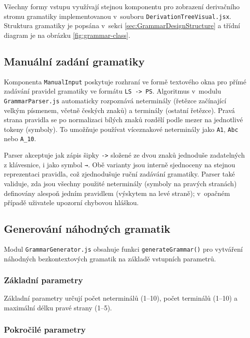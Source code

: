 Všechny formy vstupu využívají stejnou komponentu pro zobrazení derivačního stromu gramatiky implementovanou v~souboru \texttt{DerivationTreeVisual.jsx}. Struktura gramatiky je popsána v~sekci \ref{sec:GrammarDesignStructure} a třídní diagram je na obrázku \ref{fig:grammar-class}.

\subsection{Manuální zadání gramatiky}
\label{sec:GrammarsManualImpl}

Komponenta \texttt{ManualInput} poskytuje rozhraní ve formě textového okna pro přímé zadávání pravidel gramatiky ve formátu \texttt{LS -> PS}. Algoritmus v~modulu \texttt{GrammarParser.js} automaticky rozpoznává neterminály (řetězce začínající velkým písmenem, včetně českých znaků) a terminály (ostatní řetězce). Pravá strana pravidla se po normalizaci bílých znaků rozdělí podle mezer na jednotlivé tokeny (symboly). To umožňuje používat víceznakové neterminály jako \texttt{A1}, \texttt{Abc} nebo \texttt{A\_10}.

Parser akceptuje jak zápis šipky \texttt{->} složené ze dvou znaků jednoduše zadatelných z klávesnice, i jako symbol \texttt{→}. Obě varianty jsou interně sjednoceny na stejnou reprezentaci pravidla, což zjednodušuje ruční zadávání gramatiky. Parser také validuje, zda jsou všechny použité neterminály (symboly na pravých stranách) definovány alespoň jedním pravidlem (výskytem na levé straně); v~opačném případě uživatele upozorní chybovou hláškou.

\subsection{Generování náhodných gramatik}
\label{sec:GrammarsGenerationImpl}

Modul \texttt{GrammarGenerator.js} obsahuje funkci \texttt{generateGrammar()} pro vytváření náhodných bezkontextových gramatik na základě vstupních parametrů.

\subsubsection*{Základní parametry}

Základní parametry určují počet neterminálů (1--10), počet terminálů (1--10) a maximální délku pravé strany (1--5).

\subsubsection*{Pokročilé parametry}

